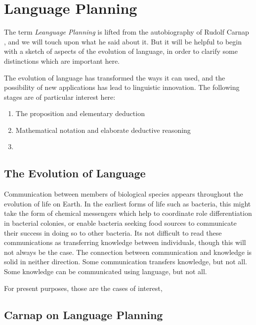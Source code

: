 
\chapter{Language Planning}\label{LanguagePlanning}



The term \emph{Leanguage Planning} is lifted from the autobiography of Rudolf Carnap \cite{carnap63}, and we will touch upon what he said about it.
But it will be helpful to begin with a sketch of aspects of the evolution of language, in order to clarify some distinctions which are important here.

The evolution of language has transformed the ways it can used, and the possibility of new applications has lead to linguistic innovation.
The following stages are of particular interest here:

\begin{enumerate}
\item The proposition and elementary deduction
\item Mathematical notation and elaborate deductive reasoning
\item 
\end{enumerate}

\section{The Evolution of Language}

Communication between members of biological species appears throughout the evolution of life on Earth.
In the earliest forms of life such as bacteria, this might take the form of chemical messengers which help to coordinate role differentiation in bacterial colonies, or enable bacteria seeking food sources to communicate their success in doing so to other bacteria.
Its not difficult to read these communications as transferring knowledge between individuals, though this will not always be the case.
The connection between communication and knowledge is solid in neither direction.
Some communication transfers knowledge, but not all.
Some knowledge can be communicated using language, but not all.

For present purposes, those are the cases of interest,

\section{Carnap on Language Planning}

